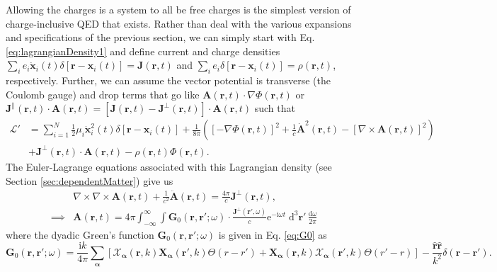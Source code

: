 \documentclass{article}
\begin{document}
Allowing the charges is a system to all be free charges is the simplest version of charge-inclusive QED that exists. Rather than deal with the various expansions and specifications of the previous section, we can simply start with Eq. \eqref{eq:lagrangianDensity1} and define current and charge densities $\sum_ie_i\dot{\mathbf{x}}_i(t)\delta[\mathbf{r} - \mathbf{x}_i(t)] = \mathbf{J}(\mathbf{r},t)$ and $\sum_ie_i\delta[\mathbf{r} - \mathbf{x}_i(t)] = \rho(\mathbf{r},t)$, respectively. Further, we can assume the vector potential is transverse (the Coulomb gauge) and drop terms that go like $\mathbf{A}(\mathbf{r},t)\cdot\nabla\Phi(\mathbf{r},t)$ or $\mathbf{J}^\parallel(\mathbf{r},t)\cdot\mathbf{A}(\mathbf{r},t) = [\mathbf{J}(\mathbf{r},t) - \mathbf{J}^\perp(\mathbf{r},t)]\cdot\mathbf{A}(\mathbf{r},t)$ such that
\begin{equation}
\begin{split}
\mathcal{L}' &= \sum_{i = 1}^N\frac{1}{2}\mu_i\dot{\mathbf{x}}_i^2(t)\delta[\mathbf{r} - \mathbf{x}_i(t)] + \frac{1}{8\pi}\left(\left[-\nabla\Phi(\mathbf{r},t)\right]^2 + \frac{1}{c}\dot{\mathbf{A}}^2(\mathbf{r},t) - \left[\nabla\times\mathbf{A}(\mathbf{r},t)\right]^2\right)\\
&+ \mathbf{J}^\perp(\mathbf{r},t)\cdot\mathbf{A}(\mathbf{r},t) - \rho(\mathbf{r},t)\Phi(\mathbf{r},t).
\end{split}
\end{equation}
The Euler-Lagrange equations associated with this Lagrangian density (see Section \ref{sec:dependentMatter}) give us
\begin{equation}
\begin{split}
&\nabla\times\nabla\times\mathbf{A}(\mathbf{r},t) + \frac{1}{c^2}\ddot{\mathbf{A}}(\mathbf{r},t) = \frac{4\pi}{c}\mathbf{J}^\perp(\mathbf{r},t),\\
\implies &\mathbf{A}(\mathbf{r},t) = 4\pi\int_{-\infty}^{\infty}\int\mathbf{G}_0(\mathbf{r},\mathbf{r}';\omega)\cdot\frac{\mathbf{J}^\perp(\mathbf{r}',\omega)}{c}\mathrm{e}^{-\mathrm{i}\omega t}\;\mathrm{d}^3\mathbf{r}'\,\frac{\mathrm{d}\omega}{2\pi}
\end{split}
\end{equation}
where the dyadic Green's function $\mathbf{G}_0(\mathbf{r},\mathbf{r}';\omega)$ is given in Eq. \eqref{eq:G0} as
\begin{equation}
\mathbf{G}_0(\mathbf{r},\mathbf{r}';\omega) = \frac{\mathrm{i}k}{4\pi}\sum_{\bm{\alpha}}\left[\bm{\mathcal{X}}_{\bm{\alpha}}(\mathbf{r},k)\mathbf{X}_{\bm{\alpha}}(\mathbf{r}',k)\Theta(r - r') + \mathbf{X}_{\bm{\alpha}}(\mathbf{r},k)\bm{\mathcal{X}}_{\bm{\alpha}}(\mathbf{r}',k)\Theta(r' - r)\right] - \frac{\hat{\mathbf{r}}\hat{\mathbf{r}}}{k^2}\delta(\mathbf{r} - \mathbf{r}').
\end{equation}
\end{document}
